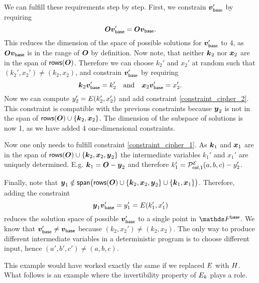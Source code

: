 We can fulfill these requirements step by step.
First, we constrain $\vbase'$ by requiring 
\[
    \O \vbase' = \O \vbase.
\]
This reduces the dimension of the space of possible solutions for $\vbase'$ to 4,
as $\O \vbase$ is in the range of $\O$ by definition.
Now note, that neither $\vk_2$ nor $\vx_2$ are in the span of $\rows(\O)$.
Therefore we can choose $k_2'$ and $x_2'$ at random such that $(k_2', x_2') \neq (k_2, x_2)$,
and constrain $\vbase'$ by requiring
\[
    \vk_2 \vbase' = k_2' \quad \textrm{and} \quad \vx_2 \vbase' = x_2'.
\]
Now we can compute $y_2' = \E(k_2', x_2')$ and add constraint \eqref{constraint_cipher_2}.
This constraint is compatible with the previous constraints because $\vy_2$ is not in the span of
$\rows(\O) \cup \{\vk_2, \vx_2\}$.
The dimension of the subspace of solutions is now 1, as we have added 4 one-dimensional constraints.

Now one only needs to fulfill constraint \eqref{constraint_cipher_1}.
As $\vk_1$ and $\vx_1$ are in the span of
$\rows(\O) \cup \{\vk_2, \vx_2, \vy_2\}$ the intermediate variables $k_1'$ and $x_1'$ are uniquely determined.
E.g. $\vk_1 = \O - \vy_2$ and therefore $k_1' = \PE[col,1](a,b,c) - y_2'$.

Finally, note that 
$\vy_1 \notin \spn\big( \rows(\O) \cup \{ \vk_2, \vx_2, \vy_2 \} \cup \{ \vk_1, \vx_1 \} \big)$.
Therefore, adding the constraint
\[
    \vy_1 \vbase' = y_1' = \E(k_1', x_1')
\]
reduces the solution space of possible $\vbase'$ to a single point in $\Base$.
We know that $\vbase' \neq \vbase$ because $(k_2, x_2') \neq (k_2, x_2)$.
The only way to produce different intermediate variables in a deterministic program is to choose different input,
hence $(a',b',c') \neq (a,b,c)$.

This example would have worked exactly the same if we replaced $\E$ with $\H$.
What follows is an example where the invertibility property of $\E_k$ plays a role.

